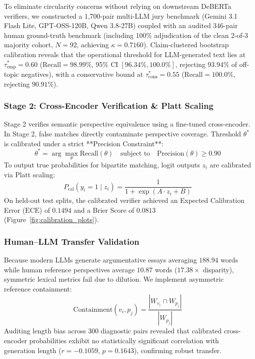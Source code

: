 \documentclass[11pt,a4paper]{article}
\begin{document}
To eliminate circularity concerns without relying on downstream DeBERTa verifiers, we constructed a 1,700-pair multi-LLM jury benchmark (Gemini 3.1 Flash Lite, GPT-OSS-120B, Qwen 3.8-27B) coupled with an audited 346-pair human ground-truth benchmark (including 100\% adjudication of the clean 2-of-3 majority cohort, $N=92$, achieving $\kappa = 0.7160$). Claim-clustered bootstrap calibration reveals that the operational threshold for LLM-generated text lies at $\tau^*_{\text{emp}} = \mathbf{0.60}$ ($\text{Recall} = 98.99\%$, 95\% CI $[96.34\%, 100.0\%]$, rejecting $93.94\%$ of off-topic negatives), with a conservative bound at $\tau^*_{\text{cons}} = \mathbf{0.55}$ ($\text{Recall} = 100.0\%$, rejecting $90.91\%$).

\subsubsection{Stage 2: Cross-Encoder Verification & Platt Scaling}
Stage 2 verifies semantic perspective equivalence using a fine-tuned cross-encoder. In Stage 2, false matches directly contaminate perspective coverage. Threshold $\theta^*$ is calibrated under a strict **Precision Constraint**:
\begin{equation}
    \theta^* = \arg\max_\theta \text{Recall}(\theta) \quad \text{subject to} \quad \text{Precision}(\theta) \ge 0.90
\end{equation}
To output true probabilities for bipartite matching, logit outputs $z_i$ are calibrated via Platt scaling:
\begin{equation}
    P_{\text{cal}}(y_i = 1 \mid z_i) = \frac{1}{1 + \exp(A \cdot z_i + B)}
\end{equation}
On held-out test splits, the calibrated verifier achieved an Expected Calibration Error ($\text{ECE}$) of $\mathbf{0.1494}$ and a Brier Score of $\mathbf{0.0813}$ (Figure~\ref{fig:calibration_plots}).

\subsubsection{Human--LLM Transfer Validation}
Because modern LLMs generate argumentative essays averaging $188.94$ words while human reference perspectives average $10.87$ words ($17.38\times$ disparity), symmetric lexical metrics fail due to dilution. We implement asymmetric reference containment:
\begin{equation}
    \text{Containment}(v_i, p_j) = \frac{|W_{v_i} \cap W_{p_j}|}{|W_{p_j}|}
\end{equation}
Auditing length bias across 300 diagnostic pairs revealed that calibrated cross-encoder probabilities exhibit no statistically significant correlation with generation length ($r = -0.1059$, $p = 0.1643$), confirming robust transfer.
\end{document}
